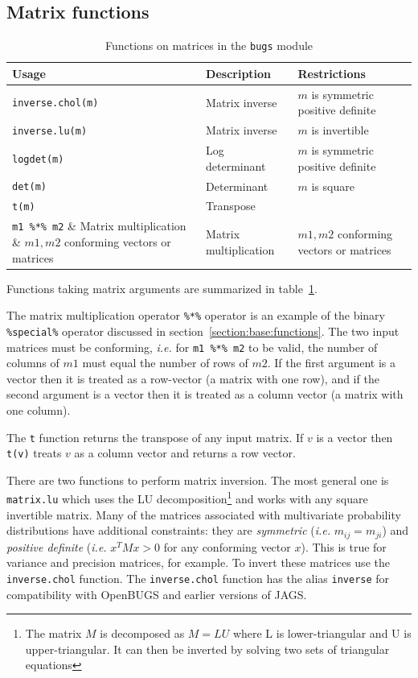 \documentclass[11pt, a4paper, titlepage]{report}
\begin{document}
\subsection{Matrix functions}

\begin{table}
\begin{center}
\begin{tabular}{lll}
\hline
Usage & Description & Restrictions \\
\hline
\verb+inverse.chol(m)+ & Matrix inverse & $m$ is symmetric positive definite  \\
\verb+inverse.lu(m)+ & Matrix inverse & $m$ is invertible \\
\verb+logdet(m)+ & Log determinant & $m$ is symmetric positive definite \\
\verb+det(m)+ & Determinant & $m$ is square \\
\verb+t(m)+    & Transpose                & \\
\verb+m1 %*% m2+  & Matrix multiplication & $m1,m2$ conforming vectors or matrices\\

\hline
\end{tabular}
\caption{Functions on matrices in the \texttt{bugs}
  module \label{table:bugs:matrix}}
\end{center}
\end{table}

Functions taking matrix arguments are summarized in
table~\ref{table:bugs:matrix}.

The matrix multiplication operator \verb+%*%+ operator is an example
of the binary \verb+%special%+ operator discussed in
section~\ref{section:base:functions}. The two input matrices must be
conforming, {\em i.e.} for \verb+m1 %*% m2+ to be valid, the number of
columns of $m1$ must equal the number of rows of $m2$. If the first
argument is a vector then it is treated as a row-vector (a matrix with
one row), and if the second argument is a vector then it is treated as
a column vector (a matrix with one column).

The \texttt{t} function returns the transpose of any input matrix. If
$v$ is a vector then \texttt{t(v)} treats $v$ as a column vector and
returns a row vector.

There are two functions to perform matrix inversion. The most general
one is \texttt{matrix.lu} which uses the LU decomposition\footnote{The
  matrix $M$ is decomposed as $M = LU$ where L is lower-triangular and
  U is upper-triangular. It can then be inverted by solving two sets
  of triangular equations} and works with any square invertible
matrix.  Many of the matrices associated with multivariate probability
distributions have additional constraints: they are {\em symmetric}
({\em i.e.} $m_{ij} = m_{ji}$) and {\em positive definite} ({\em i.e.}
$x^T M x > 0$ for any conforming vector $x$). This is true for
variance and precision matrices, for example. To invert these matrices
use the \texttt{inverse.chol} function. The \texttt{inverse.chol}
function has the alias \texttt{inverse} for compatibility with
OpenBUGS and earlier versions of JAGS.
\end{document}
